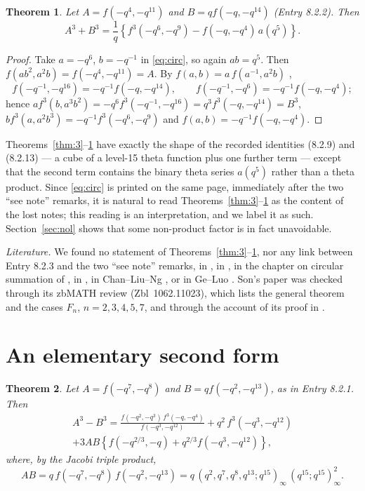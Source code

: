 \documentclass[pdflatex,sn-mathphys-num]{sn-jnl}
\theoremstyle{thmstyleone}%
\newtheorem{theorem}{Theorem}%
\theoremstyle{thmstyletwo}%
\newcommand{\f}{f}
\begin{document}
\begin{theorem}\label{thm:4}
Let $A=\f(-q^4,-q^{11})$ and $B=q\f(-q,-q^{14})$ (Entry 8.2.2). Then
\begin{equation}\label{eq:T4}
A^3+B^3=\frac1q\left\{\f^3(-q^6,-q^9)-\f(-q,-q^4)\,a(q^5)\right\}.
\end{equation}
\end{theorem}
\begin{proof}
Take $a=-q^6$, $b=-q^{-1}$ in \eqref{eq:circ}, so again $ab=q^5$. Then
$\f(ab^2,a^2b)=\f(-q^4,-q^{11})=A$. By $\f(a,b)=a\,\f(a^{-1},a^2b)$
\cite[p.~34]{BerndtIII},
\[
\f(-q^{-1},-q^{16})=-q^{-1}\f(-q,-q^{14}),\qquad \f(-q^{-1},-q^6)=-q^{-1}\f(-q,-q^4);
\]
hence $a\f^3(b,a^3b^2)=-q^6\f^3(-q^{-1},-q^{16})=q^3\f^3(-q,-q^{14})=B^3$,
$b\f^3(a,a^2b^3)=-q^{-1}\f^3(-q^6,-q^9)$ and $\f(a,b)=-q^{-1}\f(-q,-q^4)$.
\end{proof}

Theorems~\ref{thm:3}--\ref{thm:4} have exactly the shape of the recorded
identities (8.2.9) and (8.2.13) --- a cube of a level-15 theta function plus one
further term --- except that the second term contains the binary theta series
$a(q^5)$ rather than a theta product. Since \eqref{eq:circ} is printed on the same
page, immediately after the two ``see note'' remarks, it is natural to read
Theorems~\ref{thm:3}--\ref{thm:4} as the content of the lost notes; this reading
is an interpretation, and we label it as such. Section~\ref{sec:nol} shows that
some non-product factor is in fact unavoidable.

\emph{Literature.} We found no statement of Theorems~\ref{thm:3}--\ref{thm:4}, nor
any link between Entry 8.2.3 and the two ``see note'' remarks, in \cite{Son}, in \cite{AB2}, in
the chapter on circular summation of \cite{AB3}, in \cite{AB4}, in
Chan--Liu--Ng \cite{CLN06}, or in Ge--Luo \cite{GL19}. Son's paper
\cite{Son04} was checked through its zbMATH review (Zbl~1062.11023), which
lists the general theorem and the cases $F_n$, $n=2,3,4,5,7$, and through the account of its proof in \cite[Chapter~9]{AB3}.

\section{An elementary second form}\label{sec:rekon}

\begin{theorem}\label{thm:1}
Let $A=\f(-q^7,-q^8)$ and $B=q\f(-q^2,-q^{13})$, as in Entry 8.2.1. Then
\begin{multline}\label{eq:T1}
A^3-B^3=\frac{\f(-q^2,-q^3)\,\f^3(-q,-q^4)}{\f(-q^3,-q^{12})}+q^2\,\f^3(-q^3,-q^{12})\\
+3AB\left\{\f(-q^{2/3},-q)+q^{2/3}\f(-q^3,-q^{12})\right\},
\end{multline}
where, by the Jacobi triple product,
\[
AB=q\,\f(-q^7,-q^8)\,\f(-q^2,-q^{13})
=q\,(q^2,q^7,q^8,q^{13};q^{15})_\infty\,(q^{15};q^{15})_\infty^2 .
\]
\end{theorem}
\end{document}
